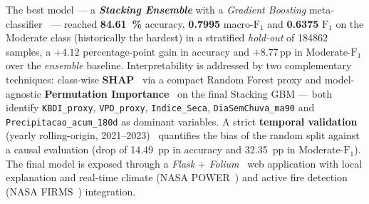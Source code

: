 \begin{foreignabstract}
The best model --- a \textbf{\emph{Stacking Ensemble}} with a \emph{Gradient Boosting} meta-classifier~\cite{friedman2001greedy} --- reached \textbf{\SI{84.61}{\percent}} accuracy, \textbf{0.7995} macro-\(\text{F}_1\) and \textbf{0.6375} \(\text{F}_1\) on the Moderate class (historically the hardest) in a stratified \emph{hold-out} of \num{184862} samples, a \(+4.12\) percentage-point gain in accuracy and \(+8.77\,\text{pp}\) in Moderate-\(\text{F}_1\) over the \emph{ensemble} baseline. Interpretability is addressed by two complementary techniques: class-wise \textbf{SHAP}~\cite{lundberg2017unified,lundberg2020local} via a compact Random Forest proxy and model-agnostic \textbf{Permutation Importance}~\cite{breiman2001random,fisher2019all} on the final Stacking GBM --- both identify \texttt{KBDI\_proxy}, \texttt{VPD\_proxy}, \texttt{Indice\_Seca}, \texttt{DiaSemChuva\_ma90} and \texttt{Precipitacao\_acum\_180d} as dominant variables. A strict \textbf{temporal validation} (yearly rolling-origin, 2021--2023)~\cite{bergmeir2012cv} quantifies the bias of the random split against a causal evaluation (drop of \SI{14.49}{pp} in accuracy and \SI{32.35}{pp} in Moderate-\(\text{F}_1\)). The final model is exposed through a \emph{Flask} + \emph{Folium}~\cite{folium,leafletjs} web application with local explanation and real-time climate (NASA POWER~\cite{nasapower}) and active fire detection (NASA FIRMS~\cite{nasafirms}) integration.
  \end{foreignabstract}
  \printlosymbols
